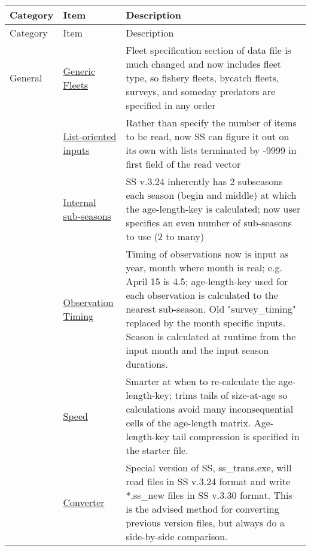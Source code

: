 \begin{center}
	{\renewcommand{\arraystretch}{1.5}%
	\begin{longtable}{p{2cm} p{3cm} p{10cm}}
		\hline
		Category & Item & Description\\
		\hline
		\endfirsthead
		\hline
		\toprule
		Category & Item & Description\\
		\hline
		\endhead

		\hline
		\endfoot

		\endlastfoot
		
		General & 
			\hyperlink{GenericFleets}{Generic Fleets} & 
				Fleet specification section of data file is much changed and now includes fleet type, so fishery fleets, bycatch fleets, surveys, and someday predators are specified in any order\\

		  & \hyperlink{ListBased}{List-oriented inputs} & 
			    Rather than specify the number of items to be read, now SS can figure it out on its own with lists terminated by -9999 in first field of the read vector \\
		  
		  & \hyperlink{SubSeas}{Internal sub-seasons} & 
			    SS v.3.24 inherently has 2 subseasons each season (begin and middle) at which the age-length-key is calculated; now user specifies an even number of sub-seasons to use (2 to many) \\

		  & \hyperlink{ObsTiming}{Observation Timing} & 
			    Timing of observations now is input as year, month where month is real; e.g. April 15 is 4.5; age-length-key used for each observation is calculated to the nearest sub-season.  Old "survey\_timing" replaced by the month specific inputs.  Season is calculated at runtime from the input month and the input season durations. \\

		  & \hyperlink{ALK}{Speed} & 
			    Smarter at when to re-calculate the age-length-key; trims tails of size-at-age so calculations avoid many inconsequential cells of the age-length matrix. Age-length-key tail compression is specified in the starter file.\\
		
		  & \hyperlink{Convert} {Converter} & 
			    Special version of SS, ss\_trans.exe, will read files in SS v.3.24 format and write *.ss\_new files in SS v.3.30 format.  This is the advised method for converting previous version files, but always do a side-by-side comparison.\\


\end{longtable}}
\end{center}

